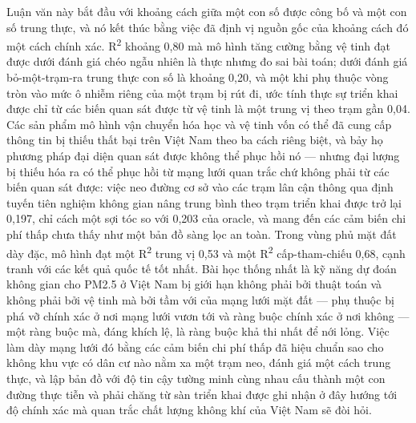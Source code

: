 Luận văn này bắt đầu với khoảng cách giữa một con số được công bố và một con số trung thực, và nó kết thúc bằng việc đã định vị nguồn gốc của khoảng cách đó một cách chính xác. R\textsuperscript{2} khoảng 0,80 mà mô hình tăng cường bằng vệ tinh đạt được dưới đánh giá chéo ngẫu nhiên là thực nhưng đo sai bài toán; dưới đánh giá bỏ-một-trạm-ra trung thực con số là khoảng 0,20, và một khi phụ thuộc vòng tròn vào mức ô nhiễm riêng của một trạm bị rút đi, ước tính thực sự triển khai được chỉ từ các biến quan sát được từ vệ tinh là một trung vị theo trạm gần 0,04. Các sản phẩm mô hình vận chuyển hóa học và vệ tinh vốn có thể đã cung cấp thông tin bị thiếu thất bại trên Việt Nam theo ba cách riêng biệt, và bảy họ phương pháp đại diện quan sát được không thể phục hồi nó --- nhưng đại lượng bị thiếu hóa ra có thể phục hồi từ mạng lưới quan trắc chứ không phải từ các biến quan sát được: việc neo đường cơ sở vào các trạm lân cận thông qua định tuyến tiên nghiệm không gian nâng trung bình theo trạm triển khai được trở lại 0,197, chỉ cách một sợi tóc so với 0,203 của oracle, và mang đến các cảm biến chi phí thấp chưa thấy như một bản đồ sàng lọc an toàn. Trong vùng phủ mặt đất dày đặc, mô hình đạt một R\textsuperscript{2} trung vị 0,53 và một R\textsuperscript{2} cấp-tham-chiếu 0,68, cạnh tranh với các kết quả quốc tế tốt nhất. Bài học thống nhất là kỹ năng dự đoán không gian cho PM2.5 ở Việt Nam bị giới hạn không phải bởi thuật toán và không phải bởi vệ tinh mà bởi tầm với của mạng lưới mặt đất --- phụ thuộc bị phá vỡ chính xác ở nơi mạng lưới vươn tới và ràng buộc chính xác ở nơi không --- một ràng buộc mà, đáng khích lệ, là ràng buộc khả thi nhất để nới lỏng. Việc làm dày mạng lưới đó bằng các cảm biến chi phí thấp đã hiệu chuẩn sao cho không khu vực có dân cư nào nằm xa một trạm neo, đánh giá một cách trung thực, và lập bản đồ với độ tin cậy tường minh cùng nhau cấu thành một con đường thực tiễn và phải chăng từ sàn triển khai được ghi nhận ở đây hướng tới độ chính xác mà quan trắc chất lượng không khí của Việt Nam sẽ đòi hỏi.
